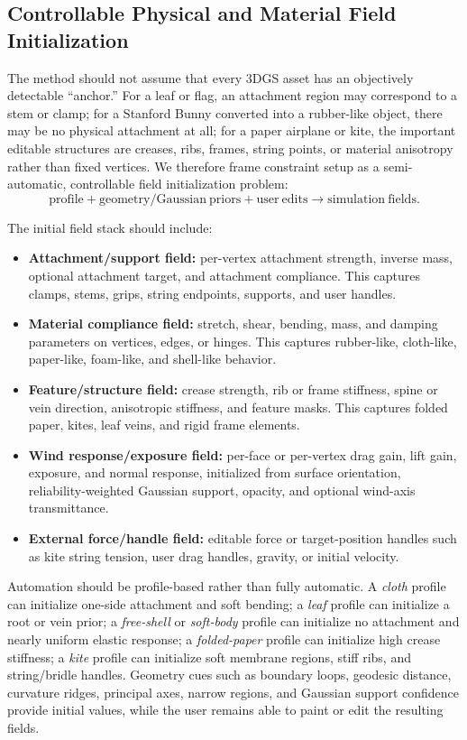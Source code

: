 \documentclass[11pt]{article}
\begin{document}
\subsection*{Controllable Physical and Material Field Initialization}

The method should not assume that every 3DGS asset has an objectively detectable ``anchor.'' For a leaf or flag, an attachment region may correspond to a stem or clamp; for a Stanford Bunny converted into a rubber-like object, there may be no physical attachment at all; for a paper airplane or kite, the important editable structures are creases, ribs, frames, string points, or material anisotropy rather than fixed vertices. We therefore frame constraint setup as a semi-automatic, controllable field initialization problem:
\[
  \mathrm{profile}
  +
  \mathrm{geometry/Gaussian\ priors}
  +
  \mathrm{user\ edits}
  \rightarrow
  \mathrm{simulation\ fields}.
\]

The initial field stack should include:
\begin{itemize}
  \item \textbf{Attachment/support field:} per-vertex attachment strength, inverse mass, optional attachment target, and attachment compliance. This captures clamps, stems, grips, string endpoints, supports, and user handles.
  \item \textbf{Material compliance field:} stretch, shear, bending, mass, and damping parameters on vertices, edges, or hinges. This captures rubber-like, cloth-like, paper-like, foam-like, and shell-like behavior.
  \item \textbf{Feature/structure field:} crease strength, rib or frame stiffness, spine or vein direction, anisotropic stiffness, and feature masks. This captures folded paper, kites, leaf veins, and rigid frame elements.
  \item \textbf{Wind response/exposure field:} per-face or per-vertex drag gain, lift gain, exposure, and normal response, initialized from surface orientation, reliability-weighted Gaussian support, opacity, and optional wind-axis transmittance.
  \item \textbf{External force/handle field:} editable force or target-position handles such as kite string tension, user drag handles, gravity, or initial velocity.
\end{itemize}

Automation should be profile-based rather than fully automatic. A \emph{cloth} profile can initialize one-side attachment and soft bending; a \emph{leaf} profile can initialize a root or vein prior; a \emph{free-shell} or \emph{soft-body} profile can initialize no attachment and nearly uniform elastic response; a \emph{folded-paper} profile can initialize high crease stiffness; a \emph{kite} profile can initialize soft membrane regions, stiff ribs, and string/bridle handles. Geometry cues such as boundary loops, geodesic distance, curvature ridges, principal axes, narrow regions, and Gaussian support confidence provide initial values, while the user remains able to paint or edit the resulting fields.
\end{document}
